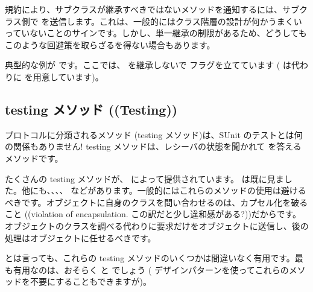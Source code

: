 \documentclass[a4paper,10pt,twoside]{book}
\begin{document}
規約により、サブクラスが継承すべきではないメソッドを通知するには、サブクラス側で  を送信します。これは、一般的にはクラス階層の設計が何かうまくいっていないことのサインです。しかし、単一継承の制限があるため、どうしてもこのような回避策を取らざるを得ない場合もあります。

典型的な例が  です。ここでは、 を継承しないで  フラグを立てています ( は代わりに  を用意しています)。



\subsection{testing メソッド ((Testing))}

 プロトコルに分類されるメソッド (testing メソッド)は、SUnit のテストとは何の関係もありません! testing メソッドは、レシーバの状態を聞かれて  を答えるメソッドです。

たくさんの testing メソッドが、 によって提供されています。 は既に見ました。他にも、、、、 などがあります。一般的にはこれらのメソッドの使用は避けるべきです。オブジェクトに自身のクラスを問い合わせるのは、カプセル化を破ること ((violation of encapsulation. この訳だと少し違和感がある?))だからです。オブジェクトのクラスを調べる代わりに要求だけをオブジェクトに送信し、後の処理はオブジェクトに任せるべきです。

とは言っても、これらの testing メソッドのいくつかは間違いなく有用です。最も有用なのは、おそらく  と  でしょう (\cite{Wool98a} デザインパターンを使ってこれらのメソッドを不要にすることもできますが)。

\end{document}
